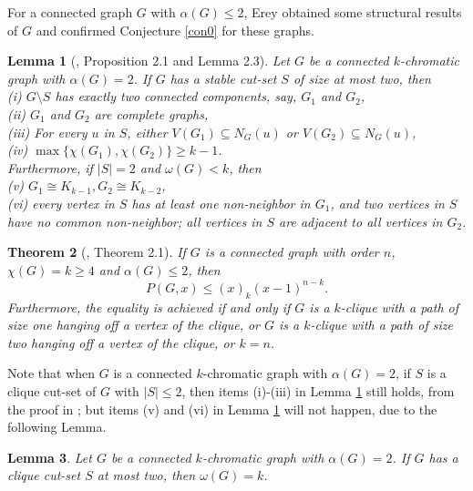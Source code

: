 \documentclass[12pt]{article}
\newtheorem{theorem}{Theorem}[section]
\newtheorem{lemma}[theorem]{Lemma}
\theoremstyle{definition}
\begin{document}
For a connected graph $G$ with $\alpha(G)\leq 2$, Erey \cite{Erey18} obtained some structural results of $G$ and confirmed Conjecture \ref{con0} for these graphs.

\begin{lemma}[\cite{Erey18}, Proposition 2.1 and Lemma 2.3]\label{CS2} Let $G$  be a connected $k$-chromatic graph with $\alpha(G)=2$. If $G$ has a stable cut-set $S$ of size at most two, then
\\(i) $G\setminus S$ has exactly two connected components, say, $G_1$ and $G_2$,
\\(ii) $G_1$ and $G_2$ are complete graphs,
\\(iii) For every $u$ in $S$, either $V(G_1)\subseteq N_G(u)$ or $V(G_2)\subseteq N_G(u)$,
\\(iv) $\max\{\chi(G_1), \chi(G_2)\}\geq k-1$.
\\Furthermore, if $|S|=2$ and $\omega(G)< k$, then
\\(v) $G_1\cong K_{k-1}, G_2\cong K_{k-2}$,
\\(vi) every vertex in $S$ has at least one non-neighbor in $G_1$, and two vertices in $S$ have no common non-neighbor; all vertices in $S$ are adjacent to all vertices in $G_2$.
\end{lemma}

\begin{theorem}[\cite{Erey18}, Theorem 2.1]\label{In2} If $G$ is a connected graph with order $n$, $\chi(G)=k\geq 4$ and
$\alpha(G)\leq 2$, then
$$P(G,x)\leq (x)_k(x-1)^{n-k}.$$
Furthermore, the equality is achieved if and only if $G$ is a $k$-clique with a path of size one hanging off a vertex of the clique, or
$G$ is a $k$-clique with a path of size two hanging off a vertex of the clique, or $k=n$.
\end{theorem}


Note that when $G$ is a connected $k$-chromatic graph with $\alpha(G)=2$, if $S$ is a clique cut-set of $G$ with $|S|\leq 2$,
then items (i)-(iii) in Lemma \ref{CS2} still holds, from the proof in \cite{Erey18}; but items (v) and (vi) in Lemma \ref{CS2} will not happen,  due to the following Lemma.

\begin{lemma}\label{CS4} Let $G$ be a connected $k$-chromatic graph with $\alpha(G)=2$. If $G$ has a clique cut-set $S$ at most two, then $\omega(G)=k$.
\end{lemma}
\end{document}
